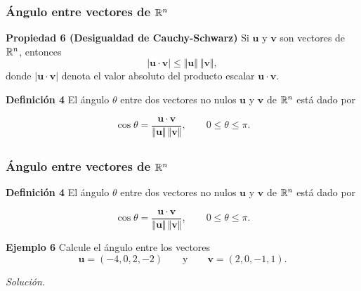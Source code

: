 \begin{frame}\frametitle{Ángulo entre vectores de $\mathbb{R}^n$}
	
	\begin{prop}{\textbf{Propiedad 6 (Desigualdad de Cauchy-Schwarz)}}
		\justifying
		Si $\mathbf{u}$ y $\mathbf{v}$ son vectores de $\mathbb{R}^n$, entonces
		\[
		|\mathbf{u}\cdot \mathbf{v}| \leq \Vert \mathbf{u}\Vert\ \Vert \mathbf{v}\Vert,
		\]
		donde $|\mathbf{u}\cdot \mathbf{v}|$ denota el valor absoluto del producto escalar $\mathbf{u}\cdot \mathbf{v}$.
	\end{prop}	
	
	\vspace{0mm}
	
	\begin{defi}{\textbf{Definición 4}}\justifying
		\justifying
		El ángulo $\theta$ entre dos vectores no nulos $\mathbf{u}$ y $\mathbf{v}$ de $\mathbb{R}^n$ 
		está dado por
		
		\vspace{-0mm}
		\[
		\cos\theta = \frac{\mathbf{u}\cdot \mathbf{v}}{\Vert \mathbf{u}\Vert \, \Vert \mathbf{v}\Vert} , \qquad 0\leq \theta\leq \pi.
		\]
	\end{defi}	
	
	
\end{frame}



\subsection{}

\begin{frame}\frametitle{Ángulo entre vectores de $\mathbb{R}^n$}

\begin{defi}{\textbf{Definición 4}}\justifying
	\justifying
	El ángulo $\theta$ entre dos vectores no nulos $\mathbf{u}$ y $\mathbf{v}$ de $\mathbb{R}^n$ 
	está dado por
	
	\vspace{-0mm}
	\[
	\cos\theta = \frac{\mathbf{u}\cdot \mathbf{v}}{\Vert \mathbf{u}\Vert \, \Vert \mathbf{v}\Vert} , \qquad 0\leq \theta\leq \pi.
	\]
\end{defi}	

\begin{ej}{\textbf{Ejemplo 6}}
	Calcule el ángulo entre los vectores
	\[
	\mathbf{u}=(-4,0,2,-2)  \qquad \text{y} \qquad \mathbf{v}=(2,0,-1,1).
	\]
\end{ej}
\textit{Solución}.

\end{frame}

